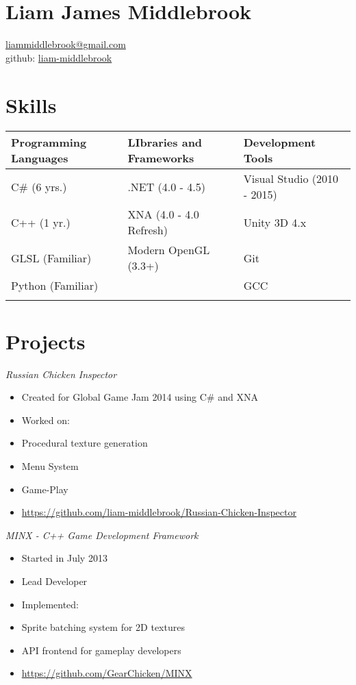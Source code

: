 \documentclass[line,margin]{res}
\begin{document}
\marginsize{.25in}{.25in}{.25in}{.25in}

\section{Liam James Middlebrook}

\href{mailto:liammiddlebrook@gmail.com}{liammiddlebrook@gmail.com}\\
github: \href{https://github.com/liam-middlebrook}{liam-middlebrook}

\begin{resume}
\section{Skills}
\begin{table}[h]
\begin{tabular}{@{}lll@{}}
\toprule
Programming Languages & LIbraries and Frameworks & Development Tools           \\ \midrule
C\# (6 yrs.)          & .NET (4.0 - 4.5)         & Visual Studio (2010 - 2015) \\
C++ (1 yr.)           & XNA (4.0 - 4.0 Refresh)  & Unity 3D 4.x                \\
GLSL (Familiar)       & Modern OpenGL (3.3+)     & Git                         \\
Python (Familiar)     &                          & GCC                         \\
                      &                          &                             \\ \bottomrule
\end{tabular}
\end{table}
\section{Projects}
\sl{Russian Chicken
Inspector}
\begin{itemize}
\itemsep1pt\parskip0pt
\item
  Created for Global Game Jam 2014 using C\# and XNA
\item
  Worked on:
\item
  Procedural texture generation
\item
  Menu System
\item
  Game-Play
\item
  \url{https://github.com/liam-middlebrook/Russian-Chicken-Inspector}
\end{itemize}
\sl{MINX - C++ Game Development
Framework}
\begin{itemize}
\itemsep1pt\parskip0pt
\item
  Started in July 2013
\item
  Lead Developer
\item
  Implemented:
\item
  Sprite batching system for 2D textures
\item
  API frontend for gameplay developers
\item
  \url{https://github.com/GearChicken/MINX}
\end{itemize}

\end{resume}
\end{document}
